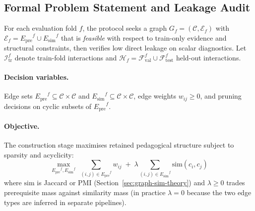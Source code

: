 \documentclass[runningheads]{llncs}
\newcommand{\Epre}{\ensuremath{E_{\text{pre}}}}
\newcommand{\Esim}{\ensuremath{E_{\text{sim}}}}
\begin{document}
\subsection{Formal Problem Statement and Leakage Audit}
\label{sec:formal-problem}
For each evaluation fold $f$, the protocol seeks a graph
$G_f=(\mathcal{C},\mathcal{E}_f)$ with $\mathcal{E}_f=\Epre^f\cup\Esim^f$
that is \emph{feasible} with respect to train-only evidence and
structural constraints, then verifies low direct leakage on scalar
diagnostics. Let $\mathcal{I}_{\text{tr}}^f$ denote train-fold
interactions and $\mathcal{H}_f=\mathcal{F}_{\text{val}}^f\cup
\mathcal{F}_{\text{test}}^f$ held-out interactions.

\paragraph{Decision variables.}
Edge sets $\Epre^f\subseteq\mathcal{C}\times\mathcal{C}$ and
$\Esim^f\subseteq\mathcal{C}\times\mathcal{C}$, edge weights
$w_{ij}\ge 0$, and pruning decisions on cyclic subsets of $\Epre^f$.

\paragraph{Objective.}
The construction stage maximises retained pedagogical structure subject
to sparsity and acyclicity:
\begin{equation}
\max_{\Epre^f,\Esim^f}\;
\sum_{(i,j)\in\Epre^f} w_{ij}
\;+\;
\lambda \sum_{(i,j)\in\Esim^f} \mathrm{sim}(c_i,c_j)
\label{eq:graph-objective}
\end{equation}
where $\mathrm{sim}$ is Jaccard or PMI (Section~\ref{sec:graph-sim-theory})
and $\lambda\ge 0$ trades prerequisite mass against similarity mass (in
practice $\lambda{=}0$ because the two edge types are inferred in
separate pipelines).
\end{document}
